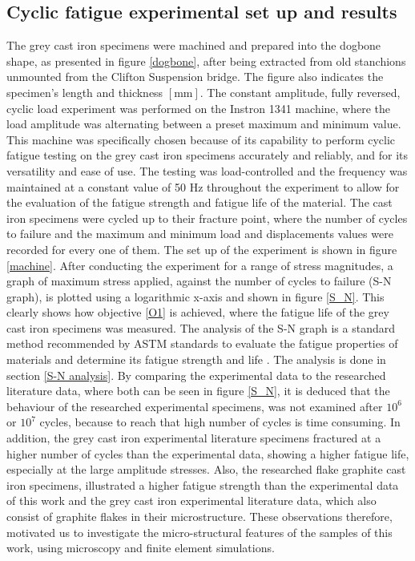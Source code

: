 \documentclass[11pt,a4paper]{article}
\begin{document}
\subsection{Cyclic fatigue experimental set up and results}
The grey cast iron specimens were machined and prepared into the dogbone shape, as presented in figure \ref{dogbone}, after being extracted from old stanchions unmounted from the Clifton Suspension bridge. The figure also indicates the specimen's length and thickness $ \left [ \textrm{mm}  \right ]$. The constant amplitude, fully reversed, cyclic load experiment was performed on the Instron 1341 machine, where the load amplitude was alternating between a preset maximum and minimum value. This machine was specifically chosen because of its capability to perform cyclic fatigue testing on the grey cast iron specimens accurately and reliably, and for its versatility and ease of use. The testing was load-controlled and the frequency was maintained at a constant value of 50 Hz throughout the experiment to allow for the evaluation of the fatigue strength and fatigue life of the material. The cast iron specimens were cycled up to their fracture point, where the number of cycles to failure and the maximum and minimum load and displacements values were recorded for every one of them. The set up of the experiment is shown in figure \ref{machine}. After conducting the experiment for a range of stress magnitudes, a graph of maximum stress applied, against the number of cycles to failure (S-N graph), is plotted using a logarithmic x-axis and shown in figure \ref{S_N}. This clearly shows how objective \ref{O1} is achieved, where the fatigue life of the grey cast iron specimens was measured. The analysis of the S-N graph is a standard method recommended by ASTM standards to evaluate the fatigue properties of materials and determine its fatigue strength and life \cite{ASTME466-07}. The analysis is done in section \ref{S-N analysis}. By comparing the experimental data to the researched literature data, where both can be seen in figure \ref{S_N}, it is deduced that the behaviour of the researched experimental specimens, was not examined after $10^6$ or $10^7$ cycles, because to reach that high number of cycles is time consuming. In addition, the grey cast iron experimental literature specimens fractured at a higher number of cycles than the experimental data, showing a higher fatigue life, especially at the large amplitude stresses. Also, the researched flake graphite cast iron specimens, illustrated a higher fatigue strength than the experimental data of this work and the grey cast iron experimental literature data, which also consist of graphite flakes in their microstructure. These observations therefore, motivated us to investigate the micro-structural features of the samples of this work, using microscopy and finite element simulations. 
\end{document}
